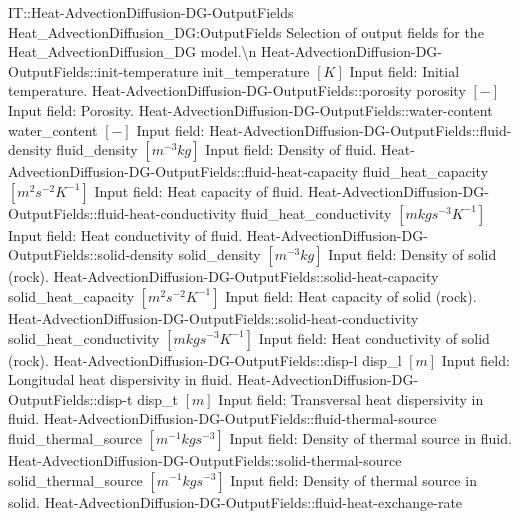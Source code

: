 \begin{SelectionType}
	{IT::Heat-AdvectionDiffusion-DG-OutputFields}
	{Heat{\_}AdvectionDiffusion{\_}DG:OutputFields}
	{{{Selection of output fields for the Heat{\_}AdvectionDiffusion{\_}DG model.{\textbackslash}n}%
}}
		\SelectionItem
			{Heat-AdvectionDiffusion-DG-OutputFields::init-temperature}
			{init{\_}temperature}
			{{{}{$[K]$}{ Input field: Initial temperature.}%
}}
		\SelectionItem
			{Heat-AdvectionDiffusion-DG-OutputFields::porosity}
			{porosity}
			{{{}{$[-]$}{ Input field: Porosity.}%
}}
		\SelectionItem
			{Heat-AdvectionDiffusion-DG-OutputFields::water-content}
			{water{\_}content}
			{{{}{$[-]$}{ Input field: }%
}}
		\SelectionItem
			{Heat-AdvectionDiffusion-DG-OutputFields::fluid-density}
			{fluid{\_}density}
			{{{}{$[m^{-3}kg]$}{ Input field: Density of fluid.}%
}}
		\SelectionItem
			{Heat-AdvectionDiffusion-DG-OutputFields::fluid-heat-capacity}
			{fluid{\_}heat{\_}capacity}
			{{{}{$[m^{2}s^{-2}K^{-1}]$}{ Input field: Heat capacity of fluid.}%
}}
		\SelectionItem
			{Heat-AdvectionDiffusion-DG-OutputFields::fluid-heat-conductivity}
			{fluid{\_}heat{\_}conductivity}
			{{{}{$[mkgs^{-3}K^{-1}]$}{ Input field: Heat conductivity of fluid.}%
}}
		\SelectionItem
			{Heat-AdvectionDiffusion-DG-OutputFields::solid-density}
			{solid{\_}density}
			{{{}{$[m^{-3}kg]$}{ Input field: Density of solid (rock).}%
}}
		\SelectionItem
			{Heat-AdvectionDiffusion-DG-OutputFields::solid-heat-capacity}
			{solid{\_}heat{\_}capacity}
			{{{}{$[m^{2}s^{-2}K^{-1}]$}{ Input field: Heat capacity of solid (rock).}%
}}
		\SelectionItem
			{Heat-AdvectionDiffusion-DG-OutputFields::solid-heat-conductivity}
			{solid{\_}heat{\_}conductivity}
			{{{}{$[mkgs^{-3}K^{-1}]$}{ Input field: Heat conductivity of solid (rock).}%
}}
		\SelectionItem
			{Heat-AdvectionDiffusion-DG-OutputFields::disp-l}
			{disp{\_}l}
			{{{}{$[m]$}{ Input field: Longitudal heat dispersivity in fluid.}%
}}
		\SelectionItem
			{Heat-AdvectionDiffusion-DG-OutputFields::disp-t}
			{disp{\_}t}
			{{{}{$[m]$}{ Input field: Transversal heat dispersivity in fluid.}%
}}
		\SelectionItem
			{Heat-AdvectionDiffusion-DG-OutputFields::fluid-thermal-source}
			{fluid{\_}thermal{\_}source}
			{{{}{$[m^{-1}kgs^{-3}]$}{ Input field: Density of thermal source in fluid.}%
}}
		\SelectionItem
			{Heat-AdvectionDiffusion-DG-OutputFields::solid-thermal-source}
			{solid{\_}thermal{\_}source}
			{{{}{$[m^{-1}kgs^{-3}]$}{ Input field: Density of thermal source in solid.}%
}}
		\SelectionItem
			{Heat-AdvectionDiffusion-DG-OutputFields::fluid-heat-exchange-rate}

\end{SelectionType}
